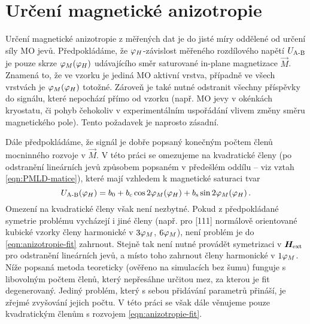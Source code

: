 \section{Určení magnetické anizotropie}
\label{chap:urceni-magneticke-anizotropie}

Určení magnetické anizotropie z měřených dat je do jisté míry oddělené od určení síly MO jevů.
Předpokládáme, že $\varphi_H$-závislost měřeného rozdílového napětí $U_\textrm{A-B}$ je pouze skrze $\varphi_M(\varphi_H)$ udávajícího směr saturované in-plane magnetizace $\vec{M}$.
Znamená to, že ve vzorku je jediná MO aktivní vrstva, případně ve všech vrstvách je $\varphi_M(\varphi_H)$ totožné.
Zároveň je také nutné odstranit všechny příspěvky do signálu, které nepochází přímo od vzorku (např. MO jevy v okénkách kryostatu, či pohyb čehokoliv v experimentálním uspořádání vlivem změny směru magnetického pole).
Tento požadavek je naprosto zásadní.

Dále předpokládáme, že signál je dobře popsaný konečným počtem členů mocninného rozvoje v $\vec{M}$.
V této práci se omezujeme na kvadratické členy (po odstranění lineárních jevů způsobem popsaném v předešlém oddílu -- viz vztah \eqref{eqn:PMLD-matice}), které mají vzhledem k magnetické saturaci tvar
\begin{equation}
\label{eqn:anizotropie-fit}
    U_\textrm{A-B}(\varphi_H) = b_0 + b_\textrm{c} \cos2\varphi_M(\varphi_H) + b_\textrm{s} \sin2\varphi_M(\varphi_H) \,.
\end{equation}
Omezení na kvadratické členy však není nezbytné.
Pokud z předpokládané symetrie problému vycházejí i jiné členy (např. pro [111] normálově orientované kubické vzorky členy harmonické v $3\varphi_M$, $6\varphi_M$), není problém je do \eqref{eqn:anizotropie-fit} zahrnout.
Stejně tak není nutné provádět symetrizaci v $\bm{H}_\textrm{ext}$ pro odstranění lineárních jevů, a místo toho zahrnout členy harmonické v $1\varphi_M$.
Níže popsaná metoda teoreticky (ověřeno na simulacích bez šumu) funguje s libovolným počtem členů, který nepřesáhne určitou mez, za kterou je fit degenerovaný.
Jediný problém, který s sebou přidávání parametrů přináší, je zřejmé zvyšování jejich počtu.
V této práci se však dále věnujeme pouze kvadratickým členům s rozvojem \eqref{eqn:anizotropie-fit}.

